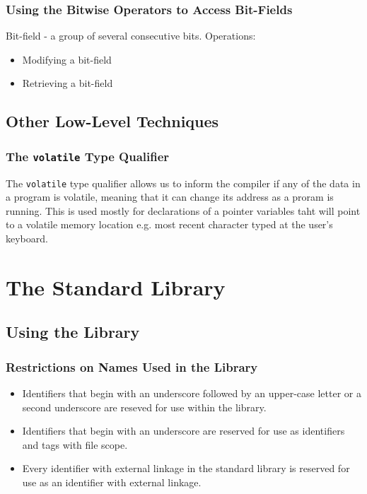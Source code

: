 \documentclass[openany]{book}
\begin{document}
    \subsection*{Using the Bitwise Operators to Access Bit-Fields}
    Bit-field - a group of several consecutive bits. Operations:
    \begin{itemize}
        \item Modifying a bit-field
        \item Retrieving a bit-field
    \end{itemize}

    \section{Other Low-Level Techniques}
    
    \subsection*{The \texttt{volatile} Type Qualifier}
    The \texttt{volatile} type qualifier allows us to inform the compiler if any of the data in a program is volatile, meaning that it can change its address as a proram is running. This is used mostly for declarations of a pointer variables taht will point to a volatile memory location e.g. most recent character typed at the user's keyboard.



    \chapter{The Standard Library}

    \section{Using the Library}

    \subsection*{Restrictions on Names Used in the Library}
    \begin{itemize}
        \item Identifiers that begin with an underscore followed by an upper-case letter or a second underscore are reseved for use within the library.
        \item Identifiers that begin with an underscore are reserved for use as identifiers and tags with file scope.
        \item Every identifier with external linkage in the standard library is reserved for use as an identifier with external linkage.
    \end{itemize}
\end{document}
